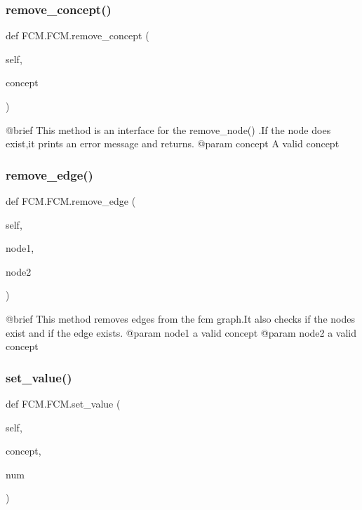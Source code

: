 \subsubsection{\texorpdfstring{remove\+\_\+concept()}{remove\_concept()}}
{\footnotesize\ttfamily def F\+C\+M.\+F\+C\+M.\+remove\+\_\+concept (\begin{DoxyParamCaption}\item[{}]{self,  }\item[{}]{concept }\end{DoxyParamCaption})}

\begin{DoxyVerb}@brief This method is an interface for the remove_node() .If the node does exist,it prints an error message and returns.
@param concept A valid concept
\end{DoxyVerb}
 \hypertarget{class_f_c_m_1_1_f_c_m_a672188f630f4a42d330f7dc967933054}{}\label{class_f_c_m_1_1_f_c_m_a672188f630f4a42d330f7dc967933054} 
\subsubsection{\texorpdfstring{remove\+\_\+edge()}{remove\_edge()}}
{\footnotesize\ttfamily def F\+C\+M.\+F\+C\+M.\+remove\+\_\+edge (\begin{DoxyParamCaption}\item[{}]{self,  }\item[{}]{node1,  }\item[{}]{node2 }\end{DoxyParamCaption})}

\begin{DoxyVerb}@brief This method removes edges from the fcm graph.It also checks if the nodes exist and if the edge exists.
@param node1 a valid concept
@param node2 a valid concept
\end{DoxyVerb}
 \hypertarget{class_f_c_m_1_1_f_c_m_a55a0daf5c9eecef4639bb15ded281aa5}{}\label{class_f_c_m_1_1_f_c_m_a55a0daf5c9eecef4639bb15ded281aa5} 
\subsubsection{\texorpdfstring{set\+\_\+value()}{set\_value()}}
{\footnotesize\ttfamily def F\+C\+M.\+F\+C\+M.\+set\+\_\+value (\begin{DoxyParamCaption}\item[{}]{self,  }\item[{}]{concept,  }\item[{}]{num }\end{DoxyParamCaption})}

